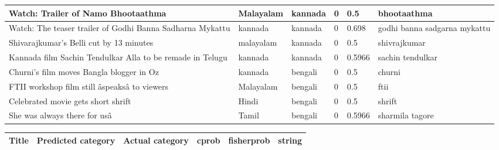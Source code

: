\begin{itemize}
\begin{table}
\begin{center}
\begin{tabular}{|p{3cm}|p{2cm}|p{2cm}|p{1.2cm}|p{1.7cm}|p{2cm}|}
   Watch: Trailer of Namo Bhootaathma& Malayalam&  kannada&0&0.5&  bhootaathma\\ \hline
	 Watch: The teaser trailer of Godhi Banna Sadharna Mykattu& kannada&  kannada&0&0.698&  godhi banna sadgarna mykattu\\ \hline
   Shivarajkumar's Belli cut by 13 minutes& malayalam&  kannada&0&0.5&  shivrajkumar\\ \hline
   Kannada film Sachin Tendulkar Alla to be remade in Telugu& kannada&  kannada&0&0.5966&  sachin tendulkar\\ \hline
   Churni's film moves Bangla blogger in Oz& kannada&  bengali&0&0.5&  churni\\ \hline
   FTII workshop film still âspeaksâ to viewers& Malayalam&  bengali&0&0.5&  ftii\\ \hline
  Celebrated movie gets short shrift& Hindi&  bengali&0&0.5&  shrift\\ \hline
	She was always there for usâ& Tamil&  bengali&0&0.5966&  sharmila tagore   \\ \hline
 \end{tabular}
\end{center}
\end{table}

\begin{table}
\label{}
\begin{center}
\begin{tabular}{|p{3cm}|p{2cm}|p{2cm}|p{1.2cm}|p{1.7cm}|p{2cm}|}
\hline
\textbf{Title} & \textbf{Predicted category} & \textbf{Actual category} & \textbf{cprob}  &\textbf{fisherprob} &\textbf{string}\\ \hline
    

\end{tabular}
\end{center}
\end{table}
\end{itemize}
